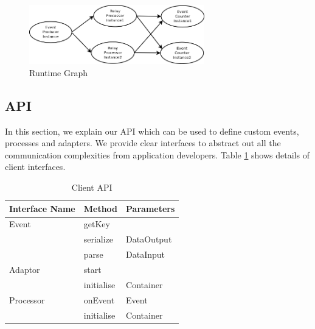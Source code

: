 \begin{figure}[!t]
        \centering
        \includegraphics[width=3.0in]{runtimegraph.png}
        \caption{Runtime Graph}
        \label{runtimegraph}
\end{figure}

\subsection{API}
In this section, we explain our API which can be used to define custom events, processes and adapters. We provide clear interfaces to abstract out all the communication complexities from application developers. Table \ref{api} shows details of client interfaces.



\begin{table}[ht]
	\centering
	\begin{tabular}{| l | l | l |}
        \hline
        Interface Name &  Method & Parameters \\
        \hline
        Event   & getKey &  \\
        \cline{2-3}
        & serialize &  DataOutput \\
	\cline{2-3}        
        & parse &  DataInput \\
        \hline
        Adaptor   & start &  \\
        \cline{2-3}
        & initialise &  Container \\
        \hline
        Processor   & onEvent & Event \\
        \cline{2-3}
        & initialise &  Container \\
        \hline
        \end{tabular}
        \caption{Client API}
        \label{api}
\end{table}


